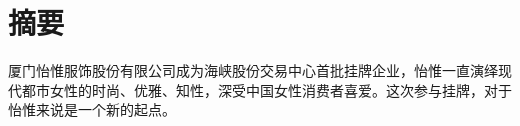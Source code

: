 \chapter{摘\hspace{2em}要}

厦门怡惟服饰股份有限公司成为海峡股份交易中心首批挂牌企业，怡惟一直演绎现代都市女性的时尚、优雅、知性，深受中国女性消费者喜爱。这次参与挂牌，对于怡惟来说是一个新的起点。
